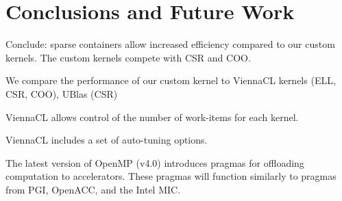 \documentclass{report}
\begin{document}
\section{Conclusions and Future Work}

Conclude: sparse containers allow increased efficiency compared to our custom kernels. The custom kernels compete with CSR and COO. 




We compare the performance of our custom kernel to ViennaCL kernels (ELL, CSR, COO), UBlas (CSR) 


ViennaCL allows control of the number of work-items for each kernel. 

ViennaCL includes a set of auto-tuning options. %









The latest version of OpenMP (v4.0) introduces pragmas for offloading computation to accelerators. These pragmas will function similarly to pragmas from PGI, OpenACC, and the Intel MIC. 


%
%
\end{document}
